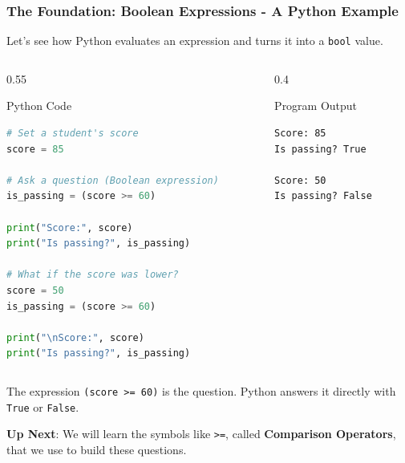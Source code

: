 \documentclass{beamer}
\begin{document}
\begin{frame}[fragile]
    \frametitle{The Foundation: Boolean Expressions - A Python Example}
    
    Let's see how Python evaluates an expression and turns it into a \texttt{bool} value.
    
    \begin{columns}[T] %
        \begin{column}{0.55\textwidth}
            \begin{block}{Python Code}
\begin{lstlisting}[language=Python]
# Set a student's score
score = 85

# Ask a question (Boolean expression)
is_passing = (score >= 60)

print("Score:", score)
print("Is passing?", is_passing)

# What if the score was lower?
score = 50
is_passing = (score >= 60)

print("\nScore:", score)
print("Is passing?", is_passing)
\end{lstlisting}
            \end{block}
        \end{column}
        
        \begin{column}{0.4\textwidth}
            \begin{block}{Program Output}
\begin{verbatim}
Score: 85
Is passing? True

Score: 50
Is passing? False
\end{verbatim}
            \end{block}
        \end{column}
    \end{columns}
    
    The expression \texttt{(score >= 60)} is the question. Python answers it directly with \texttt{True} or \texttt{False}.
    
    \vfill
    \textbf{Up Next}: We will learn the symbols like \texttt{>=}, called \textbf{Comparison Operators}, that we use to build these questions.
\end{frame}
\end{document}
